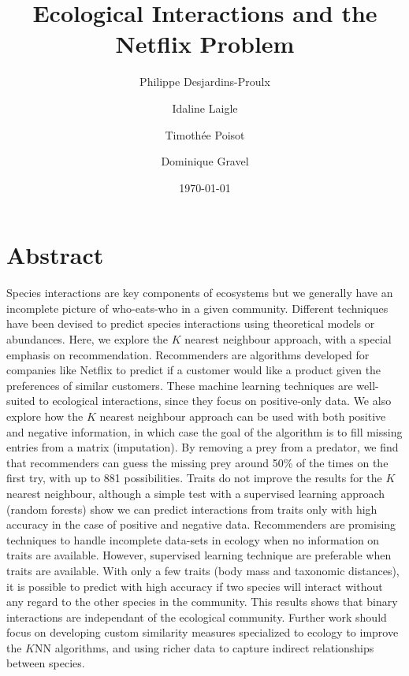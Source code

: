 \documentclass[letterpaper]{article}
\begin{document}
\title{Ecological Interactions and the Netflix Problem}
\author[0,1,2]{Philippe Desjardins-Proulx}
\author[1]{Idaline Laigle}
\author[2]{Timothée Poisot}
\author[1]{Dominique Gravel}
\date{\today}
\maketitle

\section{Abstract}

Species interactions are key components of ecosystems but we generally have an
incomplete picture of who-eats-who in a given community. Different techniques
have been devised to predict species interactions using theoretical models or
abundances. Here, we explore the $K$ nearest neighbour approach, with a special
emphasis on recommendation. Recommenders are algorithms developed for companies
like Netflix to predict if a customer would like a product given the
preferences of similar customers. These machine learning techniques are
well-suited to ecological interactions, since they focus on positive-only data.
We also explore how the $K$ nearest neighbour approach can be used with both
positive and negative information, in which case the goal of the algorithm is
to fill missing entries from a matrix (imputation). By removing a prey from a
predator, we find that recommenders can guess the missing prey around 50\% of
the times on the first try, with up to 881 possibilities. Traits do not improve
the results for the $K$ nearest neighbour, although a simple test with a
supervised learning approach (random forests) show we can predict interactions
from traits only with high accuracy in the case of positive and negative data.
Recommenders are promising techniques to handle incomplete data-sets in ecology
when no information on traits are available. However, supervised learning
technique are preferable when traits are available. With only a few traits
(body mass and taxonomic distances), it is possible to predict with high
accuracy if two species will interact without any regard to the other species
in the community. This results shows that binary interactions are independant %
of the ecological community. Further work should focus on developing custom
similarity measures specialized to ecology to improve the $K$NN algorithms,
and using richer data to capture indirect relationships between species.
\end{document}

